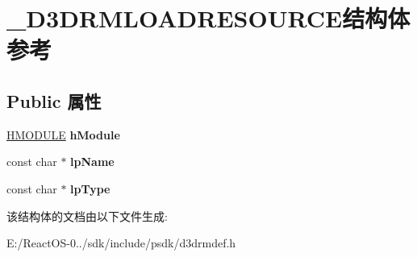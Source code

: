 \hypertarget{struct___d3_d_r_m_l_o_a_d_r_e_s_o_u_r_c_e}{}\section{\+\_\+\+D3\+D\+R\+M\+L\+O\+A\+D\+R\+E\+S\+O\+U\+R\+C\+E结构体 参考}
\label{struct___d3_d_r_m_l_o_a_d_r_e_s_o_u_r_c_e}
\subsection*{Public 属性}
\begin{DoxyCompactItemize}
\item 
\mbox{\label{struct___d3_d_r_m_l_o_a_d_r_e_s_o_u_r_c_e_ada70bc423b23abc3db1cfb73f2410810}} 
\hyperlink{interfacevoid}{H\+M\+O\+D\+U\+LE} {\bfseries h\+Module}
\item 
\mbox{\label{struct___d3_d_r_m_l_o_a_d_r_e_s_o_u_r_c_e_a7466d29d82942f7b41595a9274131d70}} 
const char $\ast$ {\bfseries lp\+Name}
\item 
\mbox{\label{struct___d3_d_r_m_l_o_a_d_r_e_s_o_u_r_c_e_aeeaea16c6dcd4e30b128419f37e5f450}} 
const char $\ast$ {\bfseries lp\+Type}
\end{DoxyCompactItemize}


该结构体的文档由以下文件生成\+:\begin{DoxyCompactItemize}
\item 
E\+:/\+React\+O\+S-\/0../sdk/include/psdk/d3drmdef.\+h\end{DoxyCompactItemize}
